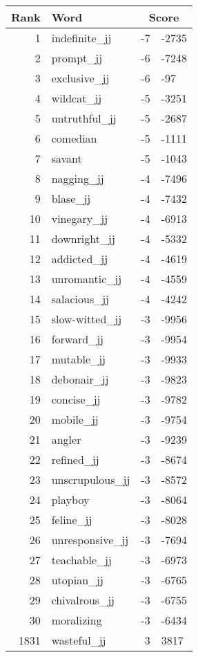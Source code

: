 \begin{longtable}[!htbp]{| rlr@{.}l |}
    \hline
    \textbf{Rank} & \textbf{Word} & \multicolumn{2}{c|}{\textbf{Score}} \\
    \hline
    \endhead
    1 & indefinite\_jj & -7 & -2735 \\
    2 & prompt\_jj & -6 & -7248 \\
    3 & exclusive\_jj & -6 & -97 \\
    4 & wildcat\_jj & -5 & -3251 \\
    5 & untruthful\_jj & -5 & -2687 \\
    6 & comedian & -5 & -1111 \\
    7 & savant & -5 & -1043 \\
    8 & nagging\_jj & -4 & -7496 \\
    9 & blase\_jj & -4 & -7432 \\
    10 & vinegary\_jj & -4 & -6913 \\
    11 & downright\_jj & -4 & -5332 \\
    12 & addicted\_jj & -4 & -4619 \\
    13 & unromantic\_jj & -4 & -4559 \\
    14 & salacious\_jj & -4 & -4242 \\
    15 & slow-witted\_jj & -3 & -9956 \\
    16 & forward\_jj & -3 & -9954 \\
    17 & mutable\_jj & -3 & -9933 \\
    18 & debonair\_jj & -3 & -9823 \\
    19 & concise\_jj & -3 & -9782 \\
    20 & mobile\_jj & -3 & -9754 \\
    21 & angler & -3 & -9239 \\
    22 & refined\_jj & -3 & -8674 \\
    23 & unscrupulous\_jj & -3 & -8572 \\
    24 & playboy & -3 & -8064 \\
    25 & feline\_jj & -3 & -8028 \\
    26 & unresponsive\_jj & -3 & -7694 \\
    27 & teachable\_jj & -3 & -6973 \\
    28 & utopian\_jj & -3 & -6765 \\
    29 & chivalrous\_jj & -3 & -6755 \\
    30 & moralizing & -3 & -6434 \\
    1831 & wasteful\_jj & 3 & 3817 \\

\end{longtable}
